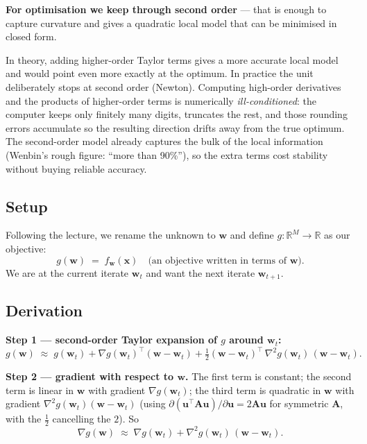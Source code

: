 \documentclass[11pt, a4paper]{article}
\begin{document}
\textbf{For optimisation we keep through second order} — that is enough to capture curvature and gives a quadratic local model that can be minimised in closed form.

\begin{pitfallbox}
In theory, adding higher-order Taylor terms gives a more accurate local model and would point even more exactly at the optimum. In practice the unit deliberately stops at second order (Newton). Computing high-order derivatives and the products of higher-order terms is numerically \emph{ill-conditioned}: the computer keeps only finitely many digits, truncates the rest, and those rounding errors accumulate so the resulting direction drifts away from the true optimum. The second-order model already captures the bulk of the local information (Wenbin's rough figure: ``more than 90\%''), so the extra terms cost stability without buying reliable accuracy.
\end{pitfallbox}

\subsection{Setup}

Following the lecture, we rename the unknown to $\mathbf{w}$ and define $g : \mathbb{R}^M \to \mathbb{R}$ as our objective:
\[
g(\mathbf{w}) \;=\; f_\mathbf{w}(\mathbf{x}) \quad\text{(an objective written in terms of $\mathbf{w}$)}.
\]
We are at the current iterate $\mathbf{w}_t$ and want the next iterate $\mathbf{w}_{t+1}$.

\subsection{Derivation}

\textbf{Step 1 — second-order Taylor expansion of $g$ around $\mathbf{w}_t$:}
\[
g(\mathbf{w}) \;\approx\; g(\mathbf{w}_t) + \nabla g(\mathbf{w}_t)^\top(\mathbf{w}-\mathbf{w}_t) + \tfrac{1}{2}(\mathbf{w}-\mathbf{w}_t)^\top\,\nabla^2 g(\mathbf{w}_t)\,(\mathbf{w}-\mathbf{w}_t).
\]

\textbf{Step 2 — gradient with respect to $\mathbf{w}$.} The first term is constant; the second term is linear in $\mathbf{w}$ with gradient $\nabla g(\mathbf{w}_t)$; the third term is quadratic in $\mathbf{w}$ with gradient $\nabla^2 g(\mathbf{w}_t)(\mathbf{w}-\mathbf{w}_t)$ (using $\partial(\mathbf{u}^\top\mathbf{A}\mathbf{u})/\partial\mathbf{u} = 2\mathbf{A}\mathbf{u}$ for symmetric $\mathbf{A}$, with the $\tfrac{1}{2}$ cancelling the $2$). So
\[
\nabla g(\mathbf{w}) \;\approx\; \nabla g(\mathbf{w}_t) + \nabla^2 g(\mathbf{w}_t)\,(\mathbf{w}-\mathbf{w}_t).
\]
\end{document}

